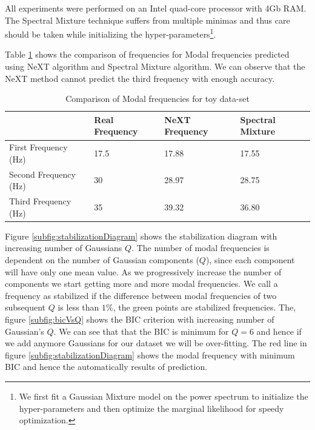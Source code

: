 All experiments were performed on an Intel quad-core processor with 4Gb RAM. The Spectral Mixture technique suffers from multiple minimas and thus care should be taken while initializing the hyper-parameters\footnote{We first fit a Gaussian Mixture model on the power spectrum to initialize the hyper-parameters and then optimize the marginal likelihood for speedy optimization.}.  

Table \ref{tabComparisonOfModalFrequenciesToyData} shows the comparison of frequencies for Modal frequencies predicted using NeXT algorithm and Spectral Mixture algorithm. We can observe that the NeXT method cannot predict the third frequency with enough accuracy. 

\renewcommand{\arraystretch}{1}
\begin{table}[!h]
    \centering
\begin{tabular}{|l|l|l|l|}
  \hline
   & Real Frequency & NeXT Frequency & Spectral Mixture\\
  \hline 
  \hline
First Frequency (Hz) & 17.5 & 17.88 & 17.55\\
Second Frequency (Hz)  & 30 & 28.97 & 28.75\\
Third Frequency (Hz) & 35 & 39.32 & 36.80\\
   \hline
\end{tabular}
\caption{Comparison of Modal frequencies for toy data-set}
  \label{tabComparisonOfModalFrequenciesToyData}
\end{table}

Figure \ref{subfig:stabilizationDiagram} shows the stabilization diagram with increasing number of Gaussians $Q$. The number of modal frequencies is dependent on the number of Gaussian components ($Q$), since each component will have only one mean value. As we progressively increase the number of components we start getting more and more modal frequencies. We call a frequency as stabilized if the difference between modal frequencies of two subsequent $Q$ is less than $1\%$, the green points are stabilized frequencies. The, figure \ref{subfig:bicVsQ} shows the BIC criterion with increasing number of Gaussian's $Q$. We can see that that the BIC is minimum for $Q=6$ and hence if we add anymore Gaussians for our dataset we will be over-fitting. The red line in figure \ref{subfig:stabilizationDiagram} shows the modal frequency with minimum BIC and hence the automatically results of prediction.

